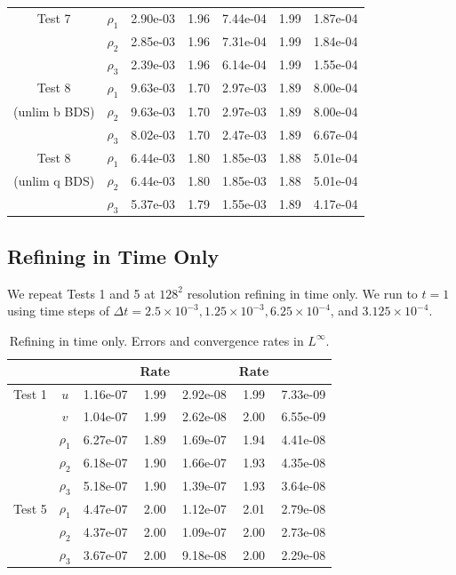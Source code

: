 \documentclass[final]{siamltex}
\begin{document}
\begin{table}[h]
\begin{center}
\begin{tabular}{ccccccc}
\hline
Test 7              & $\rho_1$ & 2.90e-03 & 1.96 & 7.44e-04 & 1.99 & 1.87e-04 \\
                    & $\rho_2$ & 2.85e-03 & 1.96 & 7.31e-04 & 1.99 & 1.84e-04 \\
                    & $\rho_3$ & 2.39e-03 & 1.96 & 6.14e-04 & 1.99 & 1.55e-04 \\
\hline
Test 8              & $\rho_1$ & 9.63e-03 & 1.70 & 2.97e-03 & 1.89 & 8.00e-04 \\
(unlim b BDS)       & $\rho_2$ & 9.63e-03 & 1.70 & 2.97e-03 & 1.89 & 8.00e-04 \\
                    & $\rho_3$ & 8.02e-03 & 1.70 & 2.47e-03 & 1.89 & 6.67e-04 \\
\hline
Test 8              & $\rho_1$ & 6.44e-03 & 1.80 & 1.85e-03 & 1.88 & 5.01e-04 \\
(unlim q BDS)       & $\rho_2$ & 6.44e-03 & 1.80 & 1.85e-03 & 1.88 & 5.01e-04 \\
                    & $\rho_3$ & 5.37e-03 & 1.79 & 1.55e-03 & 1.89 & 4.17e-04
\end{tabular}
\end{center}
\end{table}

\subsection{Refining in Time Only}
We repeat Tests 1 and 5 at $128^2$ resolution refining in time only.  We run to $t=1$ using time steps
of $\Delta t = 2.5\times 10^{-3}, 1.25\times 10^{-3}, 6.25\times 10^{-4}$, and $3.125\times 10^{-4}$.
\begin{table}[h]
\begin{center}
\caption{Refining in time only.  Errors and convergence rates in $L^\infty$.}
\label{tab:Linf_time}
\begin{tabular}{ccccccc}
& & & Rate & & Rate & \\
\hline
Test 1              & $u$      & 1.16e-07 & 1.99 & 2.92e-08 & 1.99 & 7.33e-09 \\
                    & $v$      & 1.04e-07 & 1.99 & 2.62e-08 & 2.00 & 6.55e-09 \\
                    & $\rho_1$ & 6.27e-07 & 1.89 & 1.69e-07 & 1.94 & 4.41e-08 \\
                    & $\rho_2$ & 6.18e-07 & 1.90 & 1.66e-07 & 1.93 & 4.35e-08 \\
                    & $\rho_3$ & 5.18e-07 & 1.90 & 1.39e-07 & 1.93 & 3.64e-08 \\
\hline
Test 5              & $\rho_1$ & 4.47e-07 & 2.00 & 1.12e-07 & 2.01 & 2.79e-08 \\
                    & $\rho_2$ & 4.37e-07 & 2.00 & 1.09e-07 & 2.00 & 2.73e-08 \\
                    & $\rho_3$ & 3.67e-07 & 2.00 & 9.18e-08 & 2.00 & 2.29e-08 \\
\end{tabular}
\end{center}
\end{table}
\end{document}
